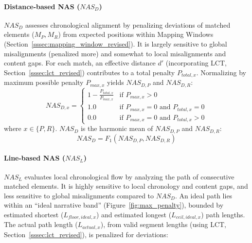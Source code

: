 \documentclass[letterpaper]{article} %
\begin{document}
\paragraph{Distance-based NAS ($NAS_D$)}
\label{sssec:nasd_revised}
$NAS_D$ assesses chronological alignment by penalizing deviations of matched elements ($M_P, M_R$) from expected positions within Mapping Windows (Section~\ref{sssec:mapping_window_revised}). It is largely sensitive to global misalignments (penalized more) and somewhat to local misalignments and content gaps. For each match, an effective distance $d'$ (incorporating LCT, Section~\ref{sssec:lct_revised}) contributes to a total penalty $P_{total,x}$. Normalizing by maximum possible penalty $P_{max,x}$ yields $NAS_{D,P}$ and $NAS_{D,R}$:
\begin{equation}
\label{eq:nas_dx_revised}
NAS_{D,x} =
\begin{cases}
1 - \frac{P_{total,x}}{P_{max,x}} & \text{if } P_{max,x} > 0 \\
1.0 & \text{if } P_{max,x} = 0 \text{ and } P_{total,x} = 0 \\
0.0 & \text{if } P_{max,x} = 0 \text{ and } P_{total,x} > 0
\end{cases}
\end{equation}
where $x \in \{P, R\}$. $NAS_D$ is the harmonic mean of $NAS_{D,P}$ and $NAS_{D,R}$:
\begin{equation}
\label{eq:nas_d_revised}
NAS_D = F_1(NAS_{D,P}, NAS_{D,R})
\end{equation}

\paragraph{Line-based NAS ($NAS_L$)}
\label{sssec:nasl_revised}
$NAS_L$ evaluates local chronological flow by analyzing the path of consecutive matched elements. It is highly sensitive to local chronology and content gaps, and less sensitive to global misalignments compared to $NAS_D$. An ideal path lies within an ``ideal narrative band'' (Figure~\ref{fig:max_penalty}), bounded by estimated shortest ($L_{floor,ideal,x}$) and estimated longest ($L_{ceil,ideal,x}$) path lengths. The actual path length ($L_{actual,x}$), from valid segment lengths (using LCT, Section~\ref{sssec:lct_revised}), is penalized for deviations:
\end{document}
